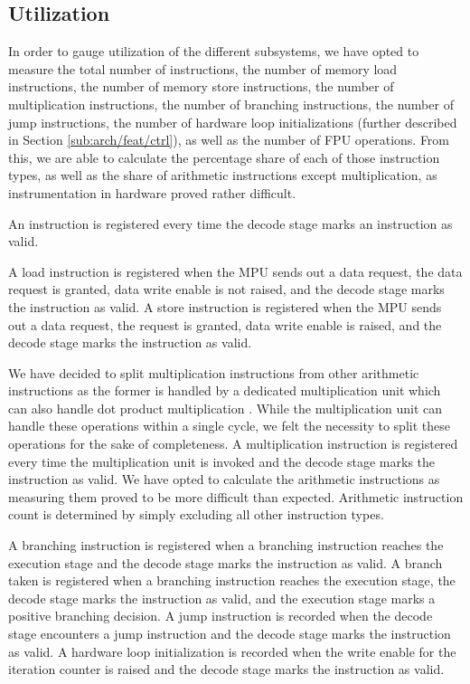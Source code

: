\documentclass[../bachelor_paper.tex]{subfiles}
\begin{document}
\subsection{Utilization}
    \label{sub:arch/feat/ut}
In order to gauge utilization of the different subsystems, we have opted to measure the total number of instructions, the number of memory load instructions, the number of memory store instructions, the number of multiplication instructions, the number of branching instructions, the number of jump instructions, the number of hardware loop initializations (further described in Section \ref{sub:arch/feat/ctrl}), as well as the number of \ac{FPU} operations. From this, we are able to calculate the percentage share of each of those instruction types, as well as the share of arithmetic instructions except multiplication, as instrumentation in hardware proved rather difficult.

An instruction is registered every time the decode stage marks an instruction as valid.

A load instruction is registered when the \ac{MPU} sends out a data request, the data request is granted, data write enable is not raised, and the decode stage marks the instruction as valid. A store instruction is registered when the \ac{MPU} sends out a data request, the request is granted, data write enable is raised, and the decode stage marks the instruction as valid.

We have decided to split multiplication instructions from other arithmetic instructions as the former is handled by a dedicated multiplication unit which can also handle dot product multiplication \cite{gautschiNearThresholdRISCVCore2017}. While the multiplication unit can handle these operations within a single cycle, we felt the necessity to split these operations for the sake of completeness. A multiplication instruction is registered every time the multiplication unit is invoked and the decode stage marks the instruction as valid. We have opted to calculate the arithmetic instructions as measuring them proved to be more difficult than expected. Arithmetic instruction count is determined by simply excluding all other instruction types.

A branching instruction is registered when a branching instruction reaches the execution stage and the decode stage marks the instruction as valid. A branch taken is registered when a branching instruction reaches the execution stage, the decode stage marks the instruction as valid, and the execution stage marks a positive branching decision. A jump instruction is recorded when the decode stage encounters a jump instruction and the decode stage marks the instruction as valid. A hardware loop initialization is recorded when the write enable for the iteration counter is raised and the decode stage marks the instruction as valid. 
\end{document}
